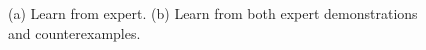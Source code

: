 \begin{figure}[h]
\centering
{}
\caption[Max margin principle]{(a) Learn from expert. (b) Learn from both expert demonstrations and counterexamples.}
\end{figure}


